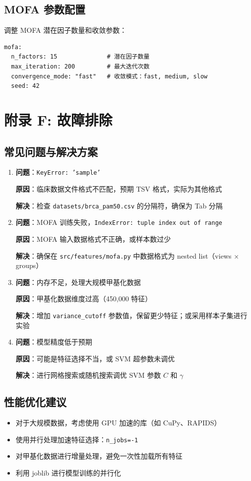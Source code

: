 \subsection*{MOFA 参数配置}

调整 MOFA 潜在因子数量和收敛参数：

\begin{verbatim}
mofa:
  n_factors: 15              # 潜在因子数量
  max_iteration: 200         # 最大迭代次数
  convergence_mode: "fast"   # 收敛模式：fast, medium, slow
  seed: 42
\end{verbatim}

\section*{附录 F: 故障排除}

\subsection*{常见问题与解决方案}

\begin{enumerate}
    \item \textbf{问题}：\texttt{KeyError: 'sample'}
    
    \textbf{原因}：临床数据文件格式不匹配，预期 TSV 格式，实际为其他格式
    
    \textbf{解决}：检查 \texttt{datasets/brca\_pam50.csv} 的分隔符，确保为 Tab 分隔
    
    \item \textbf{问题}：MOFA 训练失败，\texttt{IndexError: tuple index out of range}
    
    \textbf{原因}：MOFA 输入数据格式不正确，或样本数过少
    
    \textbf{解决}：确保在 \texttt{src/features/mofa.py} 中数据格式为 nested list（views × groups）
    
    \item \textbf{问题}：内存不足，处理大规模甲基化数据
    
    \textbf{原因}：甲基化数据维度过高（450,000 特征）
    
    \textbf{解决}：增加 \texttt{variance\_cutoff} 参数值，保留更少特征；或采用样本子集进行实验
    
    \item \textbf{问题}：模型精度低于预期
    
    \textbf{原因}：可能是特征选择不当，或 SVM 超参数未调优
    
    \textbf{解决}：进行网格搜索或随机搜索调优 SVM 参数 $C$ 和 $\gamma$
\end{enumerate}

\subsection*{性能优化建议}

\begin{itemize}
    \item 对于大规模数据，考虑使用 GPU 加速的库（如 CuPy、RAPIDS）
    \item 使用并行处理加速特征选择：\texttt{n\_jobs=-1}
    \item 对甲基化数据进行增量处理，避免一次性加载所有特征
    \item 利用 joblib 进行模型训练的并行化
\end{itemize}
